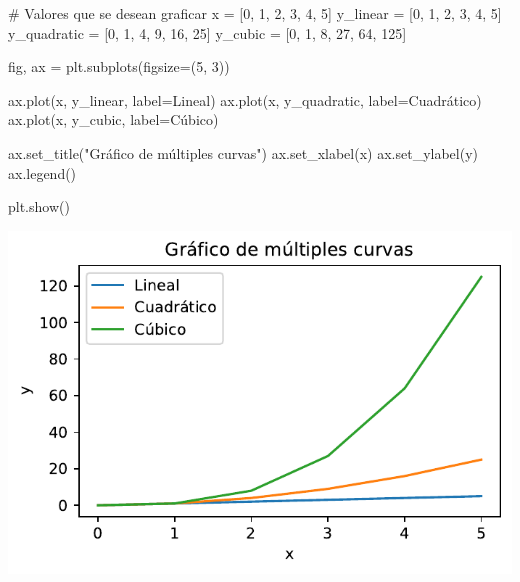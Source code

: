 \documentclass[
  letterpaper,
  DIV=11,
  numbers=noendperiod]{scrreprt}
\newenvironment{Shaded}{\begin{snugshade}}{\end{snugshade}}
\newcommand{\CommentTok}[1]{\textcolor[rgb]{0.37,0.37,0.37}{#1}}
\newcommand{\DecValTok}[1]{\textcolor[rgb]{0.68,0.00,0.00}{#1}}
\newcommand{\NormalTok}[1]{\textcolor[rgb]{0.00,0.23,0.31}{#1}}
\newcommand{\OperatorTok}[1]{\textcolor[rgb]{0.37,0.37,0.37}{#1}}
\newcommand{\StringTok}[1]{\textcolor[rgb]{0.13,0.47,0.30}{#1}}
\begin{document}
\begin{Shaded}
\begin{Highlighting}[]
\CommentTok{\# Valores que se desean graficar}
\NormalTok{x }\OperatorTok{=}\NormalTok{ [}\DecValTok{0}\NormalTok{, }\DecValTok{1}\NormalTok{, }\DecValTok{2}\NormalTok{, }\DecValTok{3}\NormalTok{, }\DecValTok{4}\NormalTok{, }\DecValTok{5}\NormalTok{]}
\NormalTok{y\_linear }\OperatorTok{=}\NormalTok{ [}\DecValTok{0}\NormalTok{, }\DecValTok{1}\NormalTok{, }\DecValTok{2}\NormalTok{, }\DecValTok{3}\NormalTok{, }\DecValTok{4}\NormalTok{, }\DecValTok{5}\NormalTok{]}
\NormalTok{y\_quadratic }\OperatorTok{=}\NormalTok{ [}\DecValTok{0}\NormalTok{, }\DecValTok{1}\NormalTok{, }\DecValTok{4}\NormalTok{, }\DecValTok{9}\NormalTok{, }\DecValTok{16}\NormalTok{, }\DecValTok{25}\NormalTok{]}
\NormalTok{y\_cubic }\OperatorTok{=}\NormalTok{ [}\DecValTok{0}\NormalTok{, }\DecValTok{1}\NormalTok{, }\DecValTok{8}\NormalTok{, }\DecValTok{27}\NormalTok{, }\DecValTok{64}\NormalTok{, }\DecValTok{125}\NormalTok{]}

\NormalTok{fig, ax }\OperatorTok{=}\NormalTok{ plt.subplots(figsize}\OperatorTok{=}\NormalTok{(}\DecValTok{5}\NormalTok{, }\DecValTok{3}\NormalTok{))}

\NormalTok{ax.plot(x, y\_linear, label}\OperatorTok{=}\StringTok{\textquotesingle{}Lineal\textquotesingle{}}\NormalTok{)}
\NormalTok{ax.plot(x, y\_quadratic, label}\OperatorTok{=}\StringTok{\textquotesingle{}Cuadrático\textquotesingle{}}\NormalTok{)}
\NormalTok{ax.plot(x, y\_cubic, label}\OperatorTok{=}\StringTok{\textquotesingle{}Cúbico\textquotesingle{}}\NormalTok{)}

\NormalTok{ax.set\_title(}\StringTok{"Gráfico de múltiples curvas"}\NormalTok{)}
\NormalTok{ax.set\_xlabel(}\StringTok{\textquotesingle{}x\textquotesingle{}}\NormalTok{)}
\NormalTok{ax.set\_ylabel(}\StringTok{\textquotesingle{}y\textquotesingle{}}\NormalTok{)}
\NormalTok{ax.legend()}

\NormalTok{plt.show()}
\end{Highlighting}
\end{Shaded}

\includegraphics{unidad_6_files/figure-pdf/cell-122-output-1.pdf}
\end{document}
